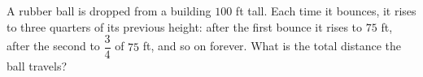 A rubber ball is dropped from a building $100$ ft tall. Each time it bounces, it rises to three quarters of its previous height: after the first bounce it rises to $75$ ft, after the second to $\dfrac{3}{4}$ of $75$ ft, and so on forever. What is the total distance the ball travels?
